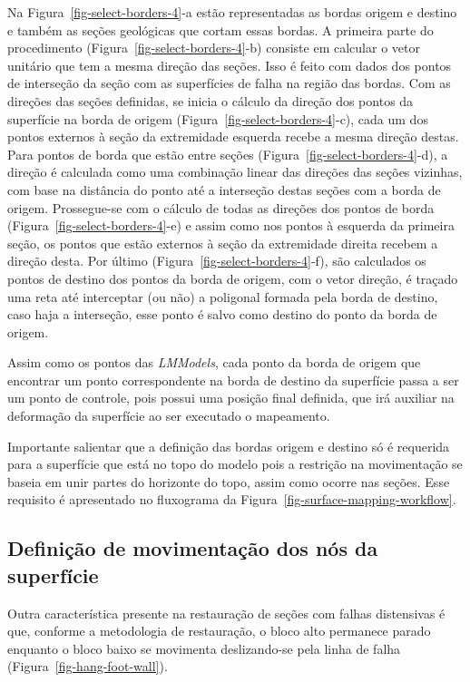 Na Figura~\ref{fig-select-borders-4}-a estão representadas as bordas origem e destino e também as seções geológicas que cortam essas bordas. A primeira parte do procedimento (Figura~\ref{fig-select-borders-4}-b) consiste em calcular o vetor unitário que tem a mesma direção das seções. Isso é feito com dados dos pontos de interseção da seção com as superfícies de falha na região das bordas. Com as direções das seções definidas, se inicia o cálculo da direção dos pontos da superfície na borda de origem (Figura~\ref{fig-select-borders-4}-c), cada um dos pontos externos à seção da extremidade esquerda recebe a mesma direção destas. Para pontos de borda que estão entre seções (Figura~\ref{fig-select-borders-4}-d), a direção é calculada como uma combinação linear das direções das seções vizinhas, com base na distância do ponto até a interseção destas seções com a borda de origem. Prossegue-se com o cálculo de todas as direções dos pontos de borda (Figura~\ref{fig-select-borders-4}-e) e assim como nos pontos à esquerda da primeira seção, os pontos que estão externos à seção da extremidade direita recebem a direção desta. Por último (Figura~\ref{fig-select-borders-4}-f), são calculados os pontos de destino dos pontos da borda de origem, com o vetor direção, é traçado uma reta até interceptar (ou não) a poligonal formada pela borda de destino, caso haja a interseção, esse ponto é salvo como destino do ponto da borda de origem.

Assim como os pontos das \textit{LMModels}, cada ponto da borda de origem que encontrar um ponto correspondente na borda de destino da superfície passa a ser um ponto de controle, pois possui uma posição final definida, que irá auxiliar na deformação da superfície ao ser executado o mapeamento.

Importante salientar que a definição das bordas origem e destino só é requerida para a superfície que está no topo do modelo pois a restrição na movimentação se baseia em unir partes do horizonte do topo, assim como ocorre nas seções. Esse requisito é apresentado no fluxograma da Figura~\ref{fig-surface-mapping-workflow}.

\subsection{Definição de movimentação dos nós da superfície}

Outra característica presente na restauração de seções com falhas distensivas é que, conforme a metodologia de restauração, o bloco alto permanece parado enquanto o bloco baixo se movimenta deslizando-se pela linha de falha (Figura~\ref{fig-hang-foot-wall}).

